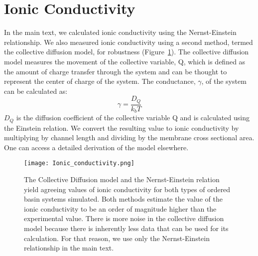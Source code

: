 

  
  \section{Ionic Conductivity}\label{S-section:ionic_conductivity}
  In the main text, we calculated ionic conductivity using the Nernst-Einstein
  relationship. We also measured ionic conductivity using a second method, termed
  the collective diffusion model\cite{liu_collective_2013}, for robustness
  (Figure~\ref{S-fig:conductivity}). The collective diffusion model measures the
  movement of the collective variable, Q, which is defined as the amount of
  charge transfer through the system and can be thought to represent the center
  of charge of the system. The conductance, $\gamma$, of the system can be
  calculated as:
  \begin{equation}
	 \gamma = \dfrac{D_Q}{k_b T} 
	\label{eqn:collective_diffusion}
  \end{equation}
  $D_Q$ is the diffusion coefficient of the collective variable Q and is 
  calculated using the Einstein relation. We convert the resulting value
  to ionic conductivity by multiplying by channel length and dividing by
  the membrane cross sectional area. One can access a detailed derivation of 
  the model elsewhere\cite{liu_collective_2013}.
  
  \begin{figure}[!htb]
        \centering
        \texttt{[image: Ionic\_conductivity.png]}
        \caption{The Collective Diffusion model and the Nernst-Einstein relation yield
        agreeing values of ionic conductivity for both types of ordered basin systems 
        simulated. Both methods estimate the value of the ionic conductivity to be an 
        order of magnitude higher than the experimental value. There is more noise in
        the collective diffusion model because there is inherently less data that 
        can be used for its calculation. For that reason, we use only the Nernst-Einstein relationship in the main text.}
        \label{S-fig:conductivity}
  \end{figure}  
  
